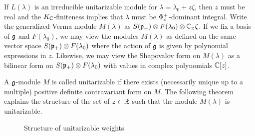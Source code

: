 If $L(\lambda)$ is an irreducible unitarizable module for $\lambda=\lambda_0+z\zeta$, then $z$ must be real and the $K_{\mathbb{C}}$-finiteness implies that $\lambda$ must be $\Phi^+_c$-dominant integral. Write the generalized Verma module $M(\lambda)$ as $S(\mathfrak{p}_+)\otimes F(\lambda_0) \otimes \mathbb{C}_z\zeta$. If we fix a basis of $\mathfrak{g}$ and $F(\lambda_0)$, we may view the modules $M(\lambda)$ as defined on the same vector space $S(\mathfrak{p}_+)\otimes F(\lambda_0)$ where the action of $\mathfrak{g}$ is given by polynomial expressions in $z$. Likewise, we may view the Shapovalov form on $M(\lambda)$ as a bilinear form on $S(\mathfrak{p}_+) \otimes F(\lambda_0)$ with values in complex polynomials $\mathbb{C}[z]$.

A $\mathfrak{g}$-module $M$ is called unitarizable if there exists (necessarily unique up to a multiple) positive definite contravariant form on $M$. The following theorem explains the structure of the set of $z\in\mathbb{R}$ such that the module $M(\lambda)$ is unitarizable.

\begin{figure}[H]\label{fig:struct}
  \begin{center}
  \end{center}\caption{Structure of unitarizable weights} %
\end{figure}

